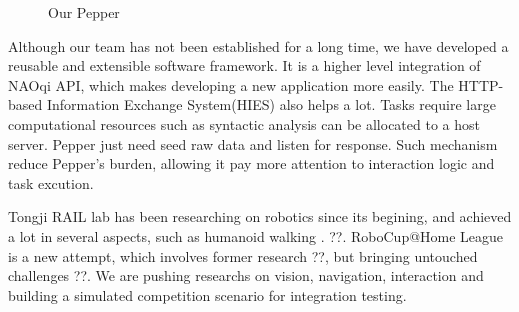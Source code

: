 \begin{figure}[!h]

    \centering
    \hspace{0.2in}
    \caption{Our Pepper}
\end{figure}
Although our team has not been established for a long time, we have developed a reusable and extensible software framework. 
It is a higher level integration of NAOqi API, which makes developing a new application more easily. 
The HTTP-based Information Exchange System(HIES) also helps a lot. 
Tasks require large computational resources such as syntactic analysis can be allocated to a host server. 
Pepper just need seed raw data and listen for response. Such mechanism reduce Pepper’s burden, allowing it pay more attention to interaction logic and task excution. 

Tongji RAIL lab has been researching on robotics since its begining, and achieved a lot in several aspects, such as humanoid walking \cite{rebalancecontrol}. ??. 
RoboCup@Home League is a new attempt, which involves former research ??, but bringing untouched challenges ??. 
We are pushing researchs on vision, navigation, interaction and building a simulated competition scenario for integration testing.
